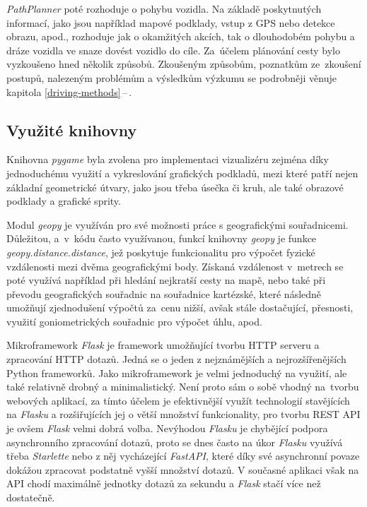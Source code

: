\documentclass[czech, bachelor]{diploma}
\newcommand{\peteref}[1]{\ref{#1}\,--\,\nameref{#1}}
\begin{document}
\emph{PathPlanner} poté rozhoduje o pohybu vozidla. Na základě poskytnutých informací, jako jsou například mapové podklady, vstup
z GPS nebo detekce obrazu, apod., rozhoduje jak o okamžitých akcích, tak o dlouhodobém pohybu a dráze vozidla ve snaze dovést
vozidlo do cíle. Za~účelem plánování cesty bylo vyzkoušeno hned několik způsobů. Zkoušeným způsobům, poznatkům ze~zkoušení
postupů, nalezeným problémům a výsledkům výzkumu se podrobněji věnuje kapitola \peteref{driving-methods}.

\subsection{Využité knihovny}

Knihovna \emph{pygame}\cite{pygame-source} byla zvolena pro implementaci vizualizéru zejména díky jednoduchému využití a
vykreslování grafických podkladů, mezi které patří nejen základní geometrické útvary, jako jsou třeba úsečka či kruh, ale také
obrazové podklady a grafické sprity.

Modul \emph{geopy}\cite{geopy-source} je využíván pro své možnosti práce s geografickými souřadnicemi. Důležitou, a~v~kódu často
využívanou, funkcí knihovny \emph{geopy} je funkce \emph{geopy.distance.distance}, jež poskytuje funkcionalitu pro výpočet fyzické
vzdálenosti mezi dvěma geografickými body. Získaná vzdálenost v~metrech se poté využívá například při hledání nejkratší cesty
na mapě, nebo také při převodu geografických souřadnic na souřadnice kartézské, které následně umožňují zjednodušení výpočtů
za~cenu nižší, avšak stále dostačující, přesnosti, využití goniometrických souřadnic pro výpočet úhlu, apod.

Mikroframework \emph{Flask}\cite{flask-source} je framework umožňující tvorbu HTTP serveru a zpracování HTTP dotazů. Jedná
se o jeden z nejznámějších a nejrozšířenějších Python frameworků. Jako mikroframework je velmi jednoduchý na využití, ale také
relativně drobný a minimalistický. Není proto sám o sobě vhodný na~tvorbu webových aplikací, za tímto účelem je efektivnější
využít technologií stavějících na \emph{Flasku} a rozšiřujících jej o větší množství funkcionality, pro tvorbu REST API je
ovšem \emph{Flask} velmi dobrá volba. Nevýhodou \emph{Flasku} je chybějící podpora asynchronního zpracování dotazů, proto se dnes
často na úkor \emph{Flasku} využívá třeba \emph{Starlette}\cite{starlette-source} nebo z něj vycházející \emph{FastAPI}\cite{
fastapi-source}, které díky své asynchronní povaze dokážou zpracovat podstatně vyšší množství dotazů. V současné aplikaci však
na API chodí maximálně jednotky dotazů za sekundu a \emph{Flask} stačí více než dostatečně.
\end{document}

